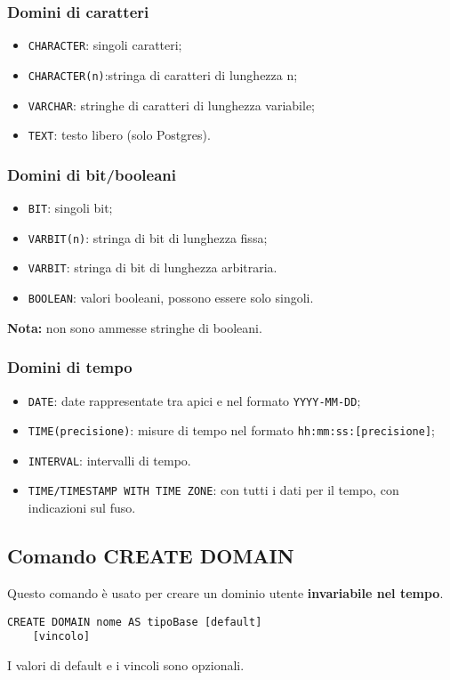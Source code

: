 \documentclass[a4paper, 10pt]{article}
\begin{document}
	\subsubsection{Domini di caratteri}
	\begin{itemize}
		\item \lstinline|CHARACTER|: singoli caratteri;
		\item \lstinline|CHARACTER(n)|:stringa di caratteri di lunghezza n;
		\item \lstinline|VARCHAR|: stringhe di caratteri di lunghezza variabile;
		\item \lstinline|TEXT|: testo libero (solo Postgres).
	\end{itemize}

	\subsubsection{Domini di bit/booleani}
	\begin{itemize}
		\item \lstinline|BIT|: singoli bit;
		\item \lstinline|VARBIT(n)|: stringa di bit di lunghezza fissa;
		\item \lstinline|VARBIT|: stringa di bit di lunghezza arbitraria.
		\item \lstinline|BOOLEAN|: valori booleani, possono essere solo singoli.
	\end{itemize}
	\textbf{Nota:} non sono ammesse stringhe di booleani.
	
	\subsubsection{Domini di tempo}
	\begin{itemize}
		\item \lstinline|DATE|: date rappresentate tra apici e nel formato \verb|YYYY-MM-DD|;
		\item \lstinline|TIME(precisione)|: misure di tempo nel formato \verb|hh:mm:ss:[precisione]|;
		\item \lstinline|INTERVAL|: intervalli di tempo.
		\item \lstinline|TIME/TIMESTAMP WITH TIME ZONE|: con tutti i dati per il tempo, con indicazioni sul fuso.
	\end{itemize}
	
	\subsection{Comando CREATE DOMAIN}
	Questo comando è usato per creare un dominio utente \textbf{invariabile nel tempo}.
	\begin{lstlisting}
CREATE DOMAIN nome AS tipoBase [default]
	[vincolo]
	\end{lstlisting}
	I valori di default e i vincoli sono opzionali.
	
\end{document}
